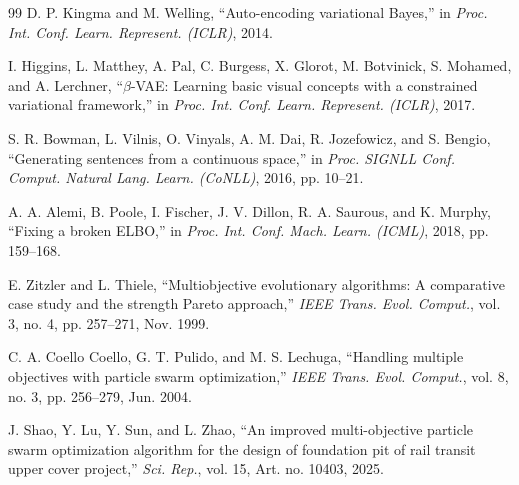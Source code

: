 \documentclass[journal]{IEEEtran}
\begin{document}
\begin{thebibliography}{99}
 D. P. Kingma and M. Welling, ``Auto-encoding variational Bayes,'' in \textit{Proc. Int. Conf. Learn. Represent. (ICLR)}, 2014.

 I. Higgins, L. Matthey, A. Pal, C. Burgess, X. Glorot, M. Botvinick, S. Mohamed, and A. Lerchner, ``$\beta$-VAE: Learning basic visual concepts with a constrained variational framework,'' in \textit{Proc. Int. Conf. Learn. Represent. (ICLR)}, 2017.

 S. R. Bowman, L. Vilnis, O. Vinyals, A. M. Dai, R. Jozefowicz, and S. Bengio, ``Generating sentences from a continuous space,'' in \textit{Proc. SIGNLL Conf. Comput. Natural Lang. Learn. (CoNLL)}, 2016, pp. 10--21.

 A. A. Alemi, B. Poole, I. Fischer, J. V. Dillon, R. A. Saurous, and K. Murphy, ``Fixing a broken ELBO,'' in \textit{Proc. Int. Conf. Mach. Learn. (ICML)}, 2018, pp. 159--168.

 E. Zitzler and L. Thiele, ``Multiobjective evolutionary algorithms: A comparative case study and the strength Pareto approach,'' \textit{IEEE Trans. Evol. Comput.}, vol. 3, no. 4, pp. 257--271, Nov. 1999.

 C. A. Coello Coello, G. T. Pulido, and M. S. Lechuga, ``Handling multiple objectives with particle swarm optimization,'' \textit{IEEE Trans. Evol. Comput.}, vol. 8, no. 3, pp. 256--279, Jun. 2004.

 J. Shao, Y. Lu, Y. Sun, and L. Zhao, ``An improved multi-objective particle swarm optimization algorithm for the design of foundation pit of rail transit upper cover project,'' \textit{Sci. Rep.}, vol. 15, Art. no. 10403, 2025.

\end{thebibliography}
\end{document}
